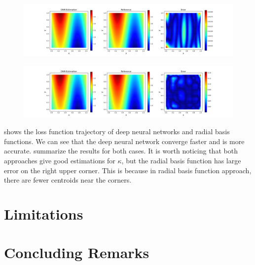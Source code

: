 \documentclass[3p,preprint,12pt]{elsarticle}
\begin{document}
\begin{figure}[htpb]
    \centering
    \includegraphics[width=1.0\textwidth]{paper/Kailai/figures/combine_nn.png}
    \caption{}
    \label{fig:nn}
\end{figure}

\begin{figure}[htpb]
    \centering
    \includegraphics[width=1.0\textwidth]{paper/Kailai/figures/combine_rbf.png}
    \caption{}
    \label{fig:rbf}
\end{figure}

 shows the loss function trajectory of deep neural networks and radial basis functions. We can see that the deep neural network converge faster and is more accurate.  summarize the results for both cases. It is worth noticing that both approaches give good estimations for $\kappa$, but the radial basis function has large error on the right upper corner. This is because in radial basis function approach, there are fewer centroids near the corners.  

\section{Limitations}


\section{Concluding Remarks}
\end{document}
